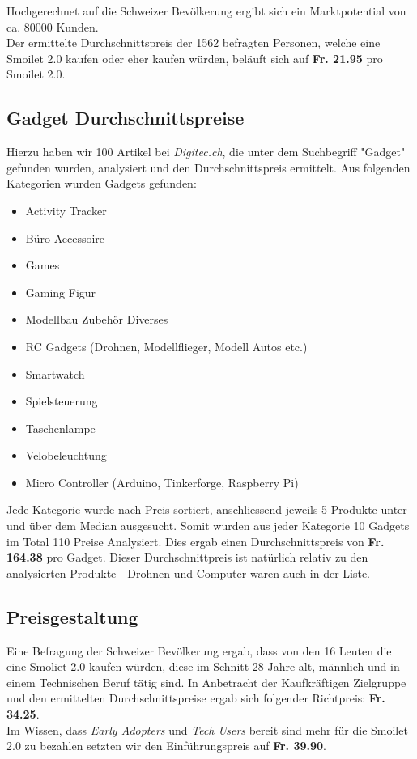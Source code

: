Hochgerechnet auf die Schweizer Bev\"olkerung ergibt sich ein Marktpotential von ca. 80000 Kunden. \\
Der ermittelte Durchschnittspreis der 1562 befragten Personen, welche eine Smoilet 2.0 kaufen oder eher kaufen w\"urden, bel\"auft sich auf \textbf{Fr. 21.95} pro Smoilet 2.0.

\subsection{Gadget Durchschnittspreise}
Hierzu haben wir 100 Artikel bei \textit{Digitec.ch}, die unter dem Suchbegriff "Gadget" gefunden wurden, analysiert und den Durchschnittspreis ermittelt. Aus folgenden Kategorien wurden Gadgets gefunden:
\begin{itemize}
\item	Activity Tracker
\item B\"uro Accessoire
\item Games
\item Gaming Figur
\item Modellbau Zubeh\"or Diverses
\item RC Gadgets (Drohnen, Modellflieger, Modell Autos etc.) 
\item Smartwatch
\item Spielsteuerung
\item Taschenlampe
\item Velobeleuchtung
\item Micro Controller (Arduino, Tinkerforge, Raspberry Pi)
\end{itemize}

Jede Kategorie wurde nach Preis sortiert, anschliessend jeweils 5 Produkte unter und \"uber dem Median ausgesucht. Somit wurden aus jeder Kategorie 10 Gadgets im Total 110 Preise Analysiert. Dies ergab einen Durchschnittspreis von \textbf{Fr. 164.38} pro Gadget. Dieser Durchschnittpreis ist natürlich relativ zu den analysierten Produkte - Drohnen und Computer waren auch in der Liste. 

\subsection{Preisgestaltung}
Eine Befragung der Schweizer Bev\"olkerung ergab, dass von den 16 Leuten die eine Smoliet 2.0 kaufen w\"urden, diese im Schnitt 28 Jahre alt, m\"annlich und in einem Technischen Beruf t\"atig sind.
In Anbetracht der Kaufkr\"aftigen Zielgruppe und den ermittelten Durchschnittspreise ergab sich folgender Richtpreis: \textbf{Fr. 34.25}. \\
Im Wissen, dass \textit{Early Adopters} und \textit{Tech Users} bereit sind mehr f\"ur die Smoilet 2.0 zu bezahlen setzten wir den Einf\"uhrungspreis auf \textbf{Fr. 39.90}.




